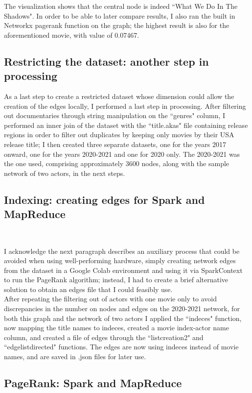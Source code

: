 \documentclass[11pt]{article}
\begin{document}
The visualization shows that the central node is indeed ``What We Do In The Shadows". In order to be able to later compare results, I also ran the built in Networkx pagerank function on the graph; the highest result is also for the aforementioned movie, with value of 0.07467.

\subsection{Restricting the dataset: another step in processing}

As a last step to create a restricted dataset whose dimension could allow the creation of the edges locally, I performed a last step in processing. 
After filtering out documentaries through string manipulation on the ``genres" column, I performed an inner join of the dataset with the ``title.akas" file containing release regions in order to filter out duplicates by keeping only movies by their USA release title; I then created three separate datasets, one for the years 2017 onward, one for the years 2020-2021 and one for 2020 only. 
The 2020-2021 was the one used, comprising approximately 3600 nodes, along with the sample network of two actors, in the next steps.

\subsection{Indexing: creating edges for Spark and MapReduce}
\

I acknowledge the next paragraph describes an auxiliary process that could be avoided when using well-performing hardware, simply creating network edges from the dataset in a Google Colab environment and using it via SparkContext to run the PageRank algorithm; instead, I had to create a brief alternative solution to obtain an edges file that I could feasibly use.\\

After repeating the filtering out of actors with one movie only to avoid discrepancies in the number on nodes and edges on the 2020-2021 network, for both this graph and the network of two actors I applied the ``indeces" function, now mapping the title names to indeces, created a movie index-actor name column, and created a file of edges through the ``listcreation2" and ``edgelistdirected" functions. The edges are now using indeces instead of movie names, and are saved in .json files for later use. 

\subsection{PageRank: Spark and MapReduce}
\end{document}
